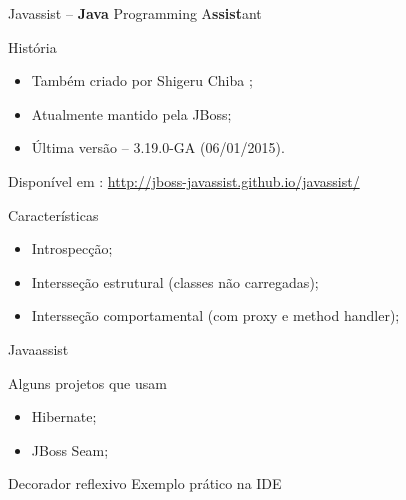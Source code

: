 \documentclass[12pt,t]{beamer}
\begin{document}
	 \begin{frame}{Javassist -- \textbf{Java} Programming A\textbf{ssist}ant}
	 	\begin{block}{História}
	 		\begin{itemize}
	 			\item Também criado por Shigeru Chiba \cite{chiba2000load};
	 			\pause
	 			\item Atualmente mantido pela JBoss;
	 			\pause
	 			\item Última versão -- 3.19.0-GA (06/01/2015).
	 		\end{itemize}
 	 	\end{block}
 	 	\pause
 	 	\begin{block}{Disponível em :}
			\url{http://jboss-javassist.github.io/javassist/}		
 	 	\end{block} 	 	
 	 	\pause
	 	\begin{block}{Características}
			\begin{itemize}
				\item Introspecção;
				\item Intersseção estrutural (\alert{classes não carregadas});
				\item Intersseção comportamental (\alert{com proxy e method handler});
 	 		\end{itemize}
 	 	\end{block}
	 \end{frame}
	 \begin{frame}{Javaassist}
	 	\begin{block}{Alguns projetos que usam}
	 		\begin{itemize}
	 			\item Hibernate;
	 			\item JBoss Seam;
	 		\end{itemize}
	 	\end{block}
	 	\pause
	 	\begin{exampleblock}{Decorador \cite{gamma1994design} reflexivo}
	 		\centering Exemplo prático na IDE
	 	\end{exampleblock}
	 			 	
	 \end{frame}
\end{document}
